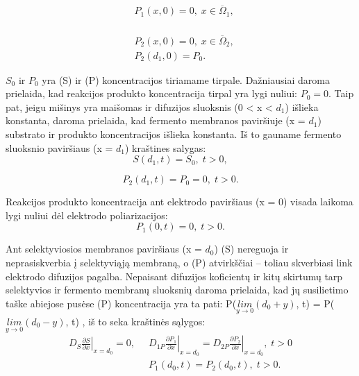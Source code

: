 \documentclass[12pt, a4paper, lithuanian]{article}
\begin{document}
\begin{equation}
\begin{aligned}
    &P_1(x, 0) = 0,\; x \in \overline\Omega_1,\\
\end{aligned}
\end{equation}

\begin{equation}
\begin{aligned}
    &P_2(x, 0) = 0,\; x \in \overline\Omega_2,\\
    &P_2(d_1, 0) = P_0.
\end{aligned}
\end{equation}

$S_0$ ir $P_0$ yra (S) ir (P) koncentracijos tiriamame tirpale. Dažniausiai
daroma prielaida, kad reakcijos produkto koncentracija tirpal yra lygi nuliui:
$P_0 = 0$. Taip pat, jeigu mišinys yra maišomas ir difuzijos sluoksnis (0 < x <
$d_1$) išlieka konstanta, daroma prielaida, kad fermento membranos paviršiuje
(x = $d_1$) substrato ir produkto koncentracijos išlieka konstanta. Iš to gauname fermento sluoksnio paviršiaus (x = $d_1$) kraštines salygas:
\begin{equation} 
    S(d_1, t) = S_0,\; t>0,
\end{equation}

\begin{equation} 
    P_2(d_1, t) = P_0 = 0,\; t>0.
\end{equation}

Reakcijos produkto koncentracija ant elektrodo paviršiaus (x = 0) visada
laikoma lygi nuliui dėl elektrodo poliarizacijos:
\begin{equation} 
    P_1(0,t)=0, \; t>0.
\end{equation}

Ant selektyviosios membranos paviršiaus (x = $d_0$) (S) nereguoja ir neprasiskverbia į
selektyviąją membraną, o (P) atvirkščiai – toliau skverbiasi link elektrodo
difuzijos pagalba. Nepaisant difuzijos koficientų ir kitų skirtumų tarp selektyvios ir
fermento membranų sluoksnių daroma prielaida, kad jų susilietimo taške abiejose
pusėse (P) koncentracija yra ta pati: P($\underset{y \to 0}{lim}(d_0 + y)$, t) =
P($\underset{y \to 0}{lim}(d_0 - y)$, t)  , iš to seka kraštinės sąlygos:
\begin{equation} 
\begin{aligned}
    \left. D_S \frac{\partial S}{\partial x} \right|_{x=d_0} = 0, \;\;
    & \left. D_{1P} \frac{\partial P_1}{\partial x} \right|_{x=d_0} = 
    \left. D_{2P} \frac{\partial P_2}{\partial x} \right|_{x=d_0},\; t > 0 \\
    & P_1(d_0, t) = P_2(d_0, t),\; t>0.
\end{aligned}
\end{equation}
\end{document}
